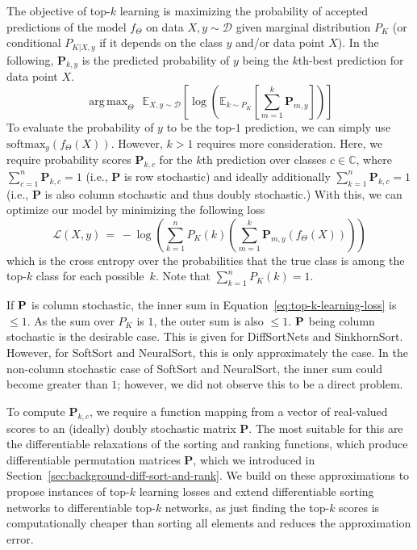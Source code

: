 \documentclass{article}
\def\mP{{\bm{P}}}
\newcommand{\softmax}{\mathrm{softmax}}
\DeclareMathOperator*{\argmax}{arg\,max}
\begin{document}
The objective of top-$k$ learning is maximizing the probability of accepted predictions of the model $f_\Theta$ on data $X, y \sim \mathcal{D}$ given marginal distribution $P_K$ (or conditional $P_{K|X,y}$ if it depends on the class $y$ and/or data point $X$). In the following, $\mP_{k,y}$ is the predicted probability of $y$ being the $k$th-best prediction for data point $X$.
\begin{equation}
    \argmax_\Theta\ \ \mathbb{E}_{X, y \sim \mathcal{D}} \left[\log\left(
    \mathbb{E}_{k \sim P_K} \left[    
            {\textstyle\sum_{m=1}^k}
            \mP_{m, y}
    \right]\right)
    \right]
\end{equation}
To evaluate the probability of $y$ to be the top-$1$ prediction, we can simply use $\softmax_y(f_\Theta (X))$.
However, $k>1$ requires more consideration. 
Here, we require probability scores $\mP_{k, c}$ for the $k$th prediction over classes $c\in\mathbb{C}$, where $\sum_{c=1}^n \mP_{k, c} = 1$ (i.e., $\mP$ is row stochastic) and ideally additionally $\sum_{k=1}^n \mP_{k, c} = 1$ (i.e., $\mP$ is also column stochastic and thus doubly stochastic.)
With this, we can optimize our model by minimizing the following loss
\begin{equation}
    \mathcal{L}(X, y)\,{=}\,{-} \log\!\left( \sum_{k=1}^n P_K(k) \!\left(\sum_{m=1}^k \mP_{m, y}(f_\Theta (X)) \right)\!\!\right)\!\!
    \label{eq:top-k-learning-loss}
\end{equation}
which is the cross entropy over the probabilities that the true class is among the top-$k$ class for each possible~$k$. 
Note that $\sum_{k=1}^n P_K(k) = 1$. 

If $\bf{P}$ is column stochastic, the inner sum in Equation~\ref{eq:top-k-learning-loss} is $\leq1$. 
As the sum over $P_K$ is $1$, the outer sum is also $\leq1$.
$\bf{P}$ being column stochastic is the desirable case. This is given for DiffSortNets and SinkhornSort. However, for SoftSort and NeuralSort, this is only approximately the case.
In the non-column stochastic case of SoftSort and NeuralSort, the inner sum could become greater than $1$; however, we did not observe this to be a direct problem.


To compute $\mP_{k, c}$, we require a function mapping from a vector of real-valued scores to an (ideally) doubly stochastic matrix $\mP$.
The most suitable for this are the differentiable relaxations of the sorting and ranking functions, which produce differentiable permutation matrices $\mP$, which we introduced in Section~\ref{sec:background-diff-sort-and-rank}.
We build on these approximations to propose instances of top-$k$ learning losses and extend differentiable sorting networks to differentiable top-$k$ networks, as just finding the top-$k$ scores is computationally cheaper than sorting all elements and reduces the approximation error.
\end{document}
